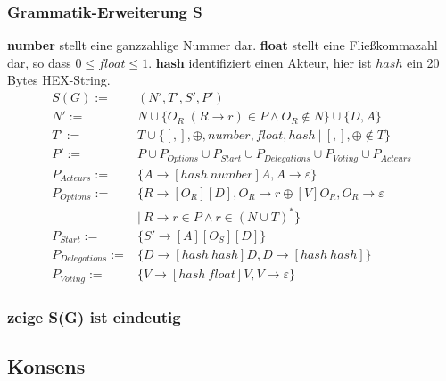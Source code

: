 \documentclass[]{article}
\begin{document}







\subsubsection*{Grammatik-Erweiterung S}


\textbf{number} stellt eine ganzzahlige Nummer dar. \textbf{float}
stellt eine Fließkommazahl dar, so dass $0\leq float \leq 1$. \textbf{hash} identifiziert einen Akteur, hier ist $hash$ ein 20 Bytes HEX-String. \\

\begin{align}
  S(G) :=& (N', T', S', P') \\
  N' :=& N \cup \{ O_R | (R\rightarrow r)\in P\land O_R \notin N\}\cup\{D, A\}\\
  T' :=& T \cup \{[ , ], \oplus, number, float, hash\ |\ [,],\oplus \notin T \}\\
  P' :=& P
  \cup P_{Options} 
  \cup P_{Start} 
  \cup P_{Delegations} 
  \cup P_{Voting} 
  \cup P_{Acteurs}
  \\
  P_{Acteurs} :=& \{A\rightarrow[hash\ number]A,A\rightarrow \varepsilon\} \\
  P_{Options} :=& \{R \rightarrow [O_R][D], O_R \rightarrow r\oplus [V] O_R, O_R \rightarrow \varepsilon \ \nonumber\\
  &\vert\ R\rightarrow r\in P \land r\in (N\cup T)^*\} \\
  P_{Start} :=& \{S'\rightarrow [A][O_S][D]\} \\
  P_{Delegations} :=& \{D\rightarrow [hash\ hash]D,D\rightarrow [hash\ hash]\} \\
  P_{Voting} :=& \{V\rightarrow [hash\ float]V, V \rightarrow \varepsilon\}
\end{align}


\subsubsection*{zeige S(G) ist eindeutig}


\subsection{Konsens}

\end{document}
